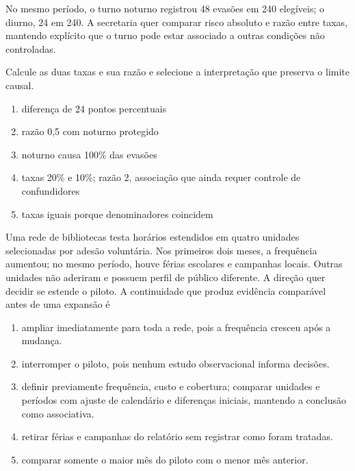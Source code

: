 
\TextoBase

No mesmo período, o turno noturno registrou 48 evasões em 240 elegíveis; o diurno, 24 em 240. A secretaria quer comparar risco absoluto e razão entre taxas, mantendo explícito que o turno pode estar associado a outras condições não controladas.

\FonteDidatica

\Comando Calcule as duas taxas e sua razão e selecione a interpretação que preserva o limite causal.

\begin{enumerate}[label=\Alph*)]

\item diferença de 24 pontos percentuais

\item razão 0,5 com noturno protegido

\item noturno causa 100\% das evasões

\item taxas 20\% e 10\%; razão 2, associação que ainda requer controle de confundidores

\item taxas iguais porque denominadores coincidem

\end{enumerate}

\TextoBase Uma rede de bibliotecas testa horários estendidos em quatro unidades selecionadas por adesão voluntária. Nos primeiros dois meses, a frequência aumentou; no mesmo período, houve férias escolares e campanhas locais. Outras unidades não aderiram e possuem perfil de público diferente. A direção quer decidir se estende o piloto.
\FonteDidatica
\Comando A continuidade que produz evidência comparável antes de uma expansão é
\begin{enumerate}[label=\Alph*)]
\item ampliar imediatamente para toda a rede, pois a frequência cresceu após a mudança.
\item interromper o piloto, pois nenhum estudo observacional informa decisões.
\item definir previamente frequência, custo e cobertura; comparar unidades e períodos com ajuste de calendário e diferenças iniciais, mantendo a conclusão como associativa.
\item retirar férias e campanhas do relatório sem registrar como foram tratadas.
\item comparar somente o maior mês do piloto com o menor mês anterior.
\end{enumerate}

